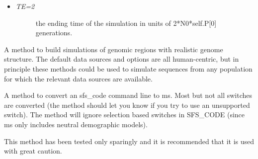 \documentclass[letterpaper,10pt,english]{sphinxmanual}
\begin{document}
\begin{fulllineitems}
\begin{fulllineitems}
\begin{itemize}
\begin{itemize}
\begin{description}
\end{description}

\item {} \begin{description}
\item[{\emph{TE=2}}] \leavevmode
the ending time of the simulation in units of 
2*N0*self.P{[}0{]} generations.

\end{description}

\end{itemize}

\end{itemize}

\end{fulllineitems}


\begin{fulllineitems}
\label{index:command.SFSCommand.build_genomic}
A method to build simulations of genomic regions with realistic 
genome structure.  The default data sources and options are all
human-centric, but in principle these methods could be used to simulate
sequences from any population for which the relevant data sources are 
available.

\end{fulllineitems}


\begin{fulllineitems}
\label{index:command.SFSCommand.convert_sfs_ms}
A method to convert an sfs\_code command line to ms.  Most but not all
switches are converted (the method should let you know if you try to
use an unsupported switch).  The method will ignore selection 
based switches in SFS\_CODE (since ms only includes neutral 
demographic models).

This method has been tested only sparingly and it is recommended that 
it is used with great caution.


\end{fulllineitems}
\end{fulllineitems}
\end{document}

